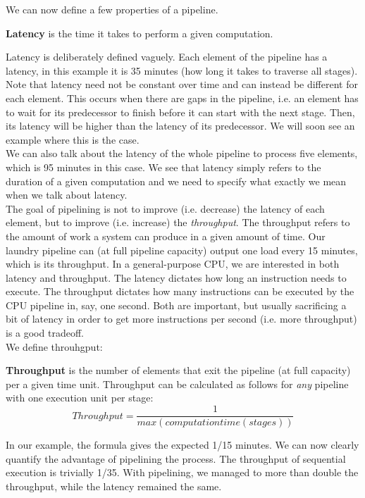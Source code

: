 \documentclass[main.tex]{subfiles}
\begin{document}
We can now define a few properties of a pipeline.
\begin{definition}
    \textbf{Latency} is the time it takes to perform a given computation.
\end{definition}
\noindent Latency is deliberately defined vaguely. Each element of the pipeline has a latency, in this example it is 35 minutes (how long it takes to traverse all stages). Note that latency need not be constant over time and can instead be different for each element. This occurs when there are gaps in the pipeline, i.e. an element has to wait for its predecessor to finish before it can start with the next stage. Then, its latency will be higher than the latency of its predecessor. We will soon see an example where this is the case.\\
We can also talk about the latency of the whole pipeline to process five elements, which is 95 minutes in this case. We see that latency simply refers to the duration of a given computation and we need to specify what exactly we mean when we talk about latency.\\[3mm]
The goal of pipelining is not to improve (i.e. decrease) the latency of each element, but to improve (i.e. increase) the \textit{throughput}. The throughput refers to the amount of work a system can produce in a given amount of time. Our laundry pipeline can (at full pipeline capacity) output one load every 15 minutes, which is its throughput. In a general-purpose CPU, we are interested in both latency and throughput. The latency dictates how long an instruction needs to execute. The throughput dictates how many instructions can be executed by the CPU pipeline in, say, one second. Both are important, but usually sacrificing a bit of latency in order to get more instructions per second (i.e. more throughput) is a good tradeoff.\\
We define throuhgput:
\begin{definition}
    \textbf{Throughput} is the number of elements that exit the pipeline (at full capacity) per a given time unit. Throughput can be calculated as follows for \textit{any} pipeline with one execution unit per stage:
    \begin{equation*}
        Throughput = \frac{1}{max(computationtime(stages))}
    \end{equation*}
\end{definition}
In our example, the formula gives the expected 1/15 minutes. We can now clearly quantify the advantage of pipelining the process. The throughput of sequential execution is trivially 1/35. With pipelining, we managed to more than double the throughput, while the latency remained the same.\\[3mm]
\end{document}

